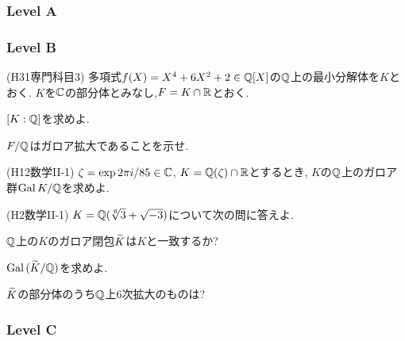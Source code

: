 \subsubsection{Level A}



\subsubsection{Level B}
\begin{prob} (H31専門科目3)
多項式$f(X) = X^4 + 6X^2 + 2\in \mathbb{Q}[X]$の$\mathbb{Q}$上の最小分解体を$K$とおく. $K$を$\mathbb{C}$の部分体とみなし,$F=K\cap \mathbb{R}$とおく.
\ben
\item $[K:\mathbb{Q}]$を求めよ.
\item $F/\mathbb{Q}$はガロア拡大であることを示せ.
\een
\end{prob}


\begin{prob} (H12数学II-1)
$\zeta = \exp{2\pi i/85}\in \mathbb{C}$, $K=\mathbb{Q}(\zeta)\cap \mathbb{R}$とするとき, $K$の$\mathbb{Q}$上のガロア群$\operatorname{Gal}{K/\mathbb{Q}}$を求めよ.
\end{prob}

\begin{prob} (H2数学II-1)
$K=\mathbb{Q}(\sqrt[6]{3} + \sqrt{-3})$について次の問に答えよ.
\ben
\item $\mathbb{Q}$上の$K$のガロア閉包$\widetilde{K}$は$K$と一致するか?
\item $\operatorname{Gal}{(\widetilde{K}/\mathbb{Q})}$を求めよ.
\item $\widetilde{K}$の部分体のうち$\mathbb{Q}$上6次拡大のものは?
\een
\end{prob}


\subsubsection{Level C}

